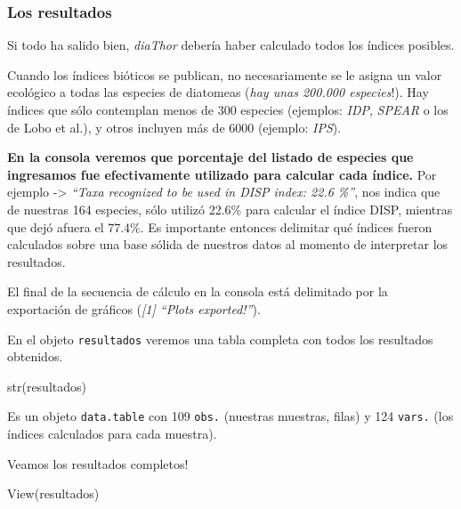 \documentclass[
]{book}
\newenvironment{Shaded}{\begin{snugshade}}{\end{snugshade}}
\newcommand{\FunctionTok}[1]{\textcolor[rgb]{0.00,0.00,0.00}{#1}}
\newcommand{\NormalTok}[1]{#1}
\begin{document}
\hypertarget{los-resultados}{%
\subsubsection{Los resultados}\label{los-resultados}}

Si todo ha salido bien, \emph{diaThor} debería haber calculado todos los índices posibles.

Cuando los índices bióticos se publican, no necesariamente se le asigna un valor ecológico a todas las especies de diatomeas (\emph{hay unas 200.000 especies}!). Hay índices que sólo contemplan menos de 300 especies (ejemplos: \emph{IDP}, \emph{SPEAR} o los de Lobo et al.), y otros incluyen más de 6000 (ejemplo: \emph{IPS}).

\textbf{En la consola veremos que porcentaje del listado de especies que ingresamos fue efectivamente utilizado para calcular cada índice.} Por ejemplo -\textgreater{} \emph{``Taxa recognized to be used in DISP index: 22.6 \%''}, nos indica que de nuestras 164 especies, sólo utilizó 22.6\% para calcular el índice DISP, mientras que dejó afuera el 77.4\%. Es importante entonces delimitar qué índices fueron calculados sobre una base sólida de nuestros datos al momento de interpretar los resultados.

El final de la secuencia de cálculo en la consola está delimitado por la exportación de gráficos (\emph{{[}1{]} ``Plots exported!''}).

En el objeto \texttt{resultados} veremos una tabla completa con todos los resultados obtenidos.

\begin{Shaded}
\begin{Highlighting}[]
\FunctionTok{str}\NormalTok{(resultados)}
\end{Highlighting}
\end{Shaded}

Es un objeto \texttt{data.table} con 109 \texttt{obs.} (nuestras muestras, filas) y 124 \texttt{vars.} (los índices calculados para cada muestra).

Veamos los resultados completos!

\begin{Shaded}
\begin{Highlighting}[]
\FunctionTok{View}\NormalTok{(resultados)}
\end{Highlighting}
\end{Shaded}
\end{document}
